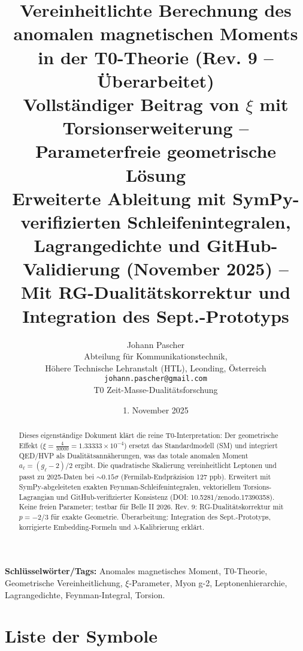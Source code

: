 \documentclass[12pt,a4paper]{article}
\title{\textbf{Vereinheitlichte Berechnung des anomalen magnetischen Moments in der T0-Theorie (Rev. 9 -- Überarbeitet)}\\[0.5cm]
	\large Vollständiger Beitrag von $\xi$ mit Torsionserweiterung -- Parameterfreie geometrische Lösung\\[0.3cm]
	\normalsize Erweiterte Ableitung mit SymPy-verifizierten Schleifenintegralen, Lagrangedichte und GitHub-Validierung (November 2025) -- Mit RG-Dualitätskorrektur und Integration des Sept.-Prototyps}
\author{Johann Pascher\\
	\small Abteilung für Kommunikationstechnik,\\
	\small Höhere Technische Lehranstalt (HTL), Leonding, Österreich\\
	\small \texttt{johann.pascher@gmail.com}\\
	\small T0 Zeit-Masse-Dualitätsforschung}
\date{1. November 2025}
\theoremstyle{definition}
\begin{document}
	
	\maketitle
	\thispagestyle{fancy}
	
	\begin{abstract}
		Dieses eigenständige Dokument klärt die reine T0-Interpretation: Der geometrische Effekt ($\xi = \frac{4}{30000} = 1.33333 \times 10^{-4}$) ersetzt das Standardmodell (SM) und integriert QED/HVP als Dualitätsannäherungen, was das totale anomalen Moment $a_\ell = (g_\ell - 2)/2$ ergibt. Die quadratische Skalierung vereinheitlicht Leptonen und passt zu 2025-Daten bei $\sim 0.15\sigma$ (Fermilab-Endpräzision 127 ppb). Erweitert mit SymPy-abgeleiteten exakten Feynman-Schleifenintegralen, vektoriellem Torsions-Lagrangian und GitHub-verifizierter Konsistenz (DOI: 10.5281/zenodo.17390358). Keine freien Parameter; testbar für Belle II 2026. Rev. 9: RG-Dualitätskorrektur mit $p=-2/3$ für exakte Geometrie. Überarbeitung: Integration des Sept.-Prototyps, korrigierte Embedding-Formeln und $\lambda$-Kalibrierung erklärt.
	\end{abstract}
	
	\textbf{Schlüsselwörter/Tags:} Anomales magnetisches Moment, T0-Theorie, Geometrische Vereinheitlichung, $\xi$-Parameter, Myon g-2, Leptonenhierarchie, Lagrangedichte, Feynman-Integral, Torsion.
	
	\tableofcontents
	
	\section*{Liste der Symbole}
	
\end{document}
